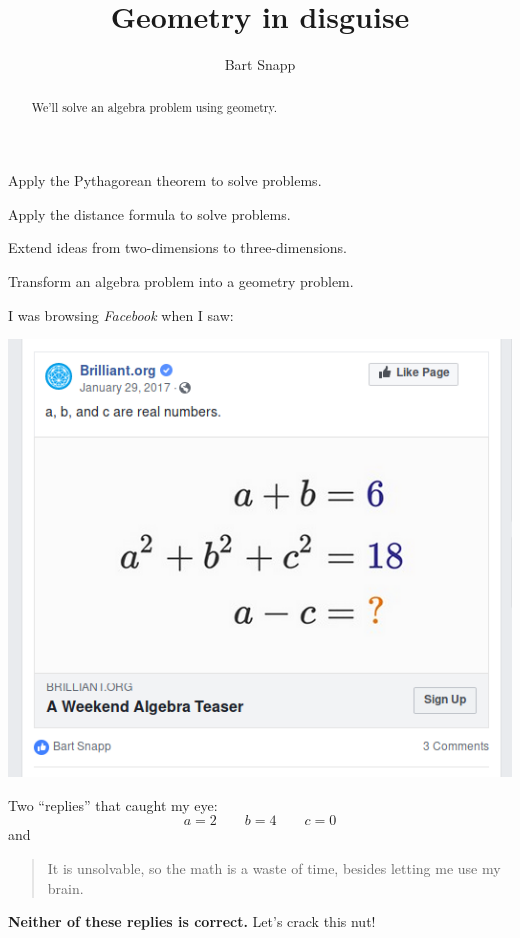 \documentclass[noauthor,nooutcomes,handout,12pt]{ximera}
\title{Geometry in disguise}
\author{Bart Snapp}
\begin{document}
\begin{abstract}
  We'll solve an algebra problem using geometry.
\end{abstract}
\maketitle

\begin{listOutcomes}
\item Apply the Pythagorean theorem to solve problems.
\item Apply the distance formula to solve problems.
\item Extend ideas from two-dimensions to three-dimensions.
\item Transform an algebra problem into a geometry problem.
\end{listOutcomes}

I was browsing \textsl{Facebook} when I saw:
\begin{center}
  \includegraphics[width=.6\textwidth]{fbQuestion.png}
\end{center}


Two ``replies'' that caught my eye:
\[
a = 2\qquad b=4\qquad c=0
\]
and
\begin{quote}
  It is unsolvable, so the math is a waste of time, besides letting
  me use my brain.
\end{quote}
\textbf{Neither of these replies is correct.} Let's crack this nut!


\mynewpage
  
\end{document}
